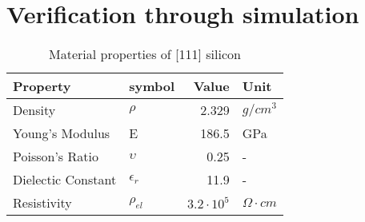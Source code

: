 \section{Verification through simulation}
\label{sec:verification}

\begin{table}
	\centering
	\begin{tabular}{ l l r l } 
		\toprule
		Property & symbol & Value & Unit \\
		\midrule
		Density & $\rho$ & 2.329 & $g/cm^3$ \\
		Young's Modulus & E & 186.5 & GPa \\ 
		Poisson's Ratio & $\upsilon$ & 0.25 & - \\ 
		Dielectic Constant & $\epsilon_r$ & 11.9 & - \\
		Resistivity & $\rho_{el}$ & $3.2\cdot10^5 $ & $\Omega \cdot cm$ \\
		\bottomrule
	\end{tabular}
	\caption{Material properties of [111] silicon}
	\label{tab:silicium_mat}
\end{table}
